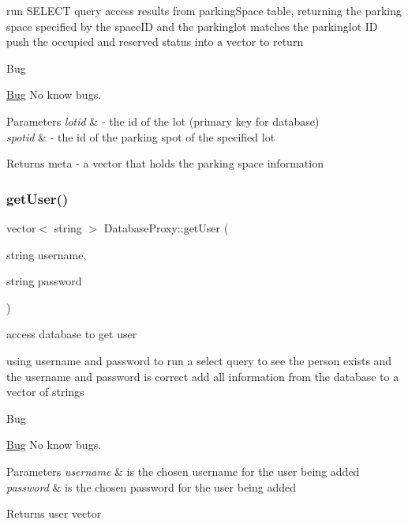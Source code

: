 run S\+E\+L\+E\+CT query access results from parking\+Space table, returning the parking space specified by the space\+ID and the parkinglot matches the parkinglot ID\textquotesingle{} push the occupied and reserved status into a vector to return

\begin{DoxyRefDesc}{Bug}
\item[\mbox{\hyperlink{bug__bug000021}{Bug}}]No know bugs. \end{DoxyRefDesc}

\begin{DoxyParams}{Parameters}
{\em lotid} & -\/ the id of the lot (primary key for database) \\
\hline
{\em spotid} & -\/ the id of the parking spot of the specified lot \\
\hline
\end{DoxyParams}
\begin{DoxyReturn}{Returns}
meta -\/ a vector that holds the parking space information 
\end{DoxyReturn}
\mbox{\label{class_database_proxy_a66ecbbd816b9528c9c537ef29a9c976e}} 
\subsubsection{\texorpdfstring{get\+User()}{getUser()}}
{\footnotesize\ttfamily vector$<$ string $>$ Database\+Proxy\+::get\+User (\begin{DoxyParamCaption}\item[{string}]{username,  }\item[{string}]{password }\end{DoxyParamCaption})}



access database to get user 

using username and password to run a select query to see the person exists and the username and password is correct add all information from the database to a vector of strings

\begin{DoxyRefDesc}{Bug}
\item[\mbox{\hyperlink{bug__bug000011}{Bug}}]No know bugs. \end{DoxyRefDesc}

\begin{DoxyParams}{Parameters}
{\em username} & is the chosen username for the user being added \\
\hline
{\em password} & is the chosen password for the user being added \\
\hline
\end{DoxyParams}
\begin{DoxyReturn}{Returns}
user vector 
\end{DoxyReturn}
\mbox{\label{class_database_proxy_ae1502f646375bb6519c715dbe5535a43}} 
